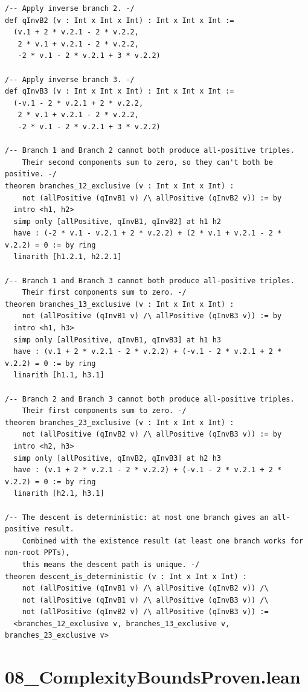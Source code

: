 \documentclass[11pt,twoside,openright]{book}
\theoremstyle{definition}
\theoremstyle{remark}
\begin{document}
\begin{lstlisting}[style=lean]
/-- Apply inverse branch 2. -/
def qInvB2 (v : Int x Int x Int) : Int x Int x Int :=
  (v.1 + 2 * v.2.1 - 2 * v.2.2,
   2 * v.1 + v.2.1 - 2 * v.2.2,
   -2 * v.1 - 2 * v.2.1 + 3 * v.2.2)

/-- Apply inverse branch 3. -/
def qInvB3 (v : Int x Int x Int) : Int x Int x Int :=
  (-v.1 - 2 * v.2.1 + 2 * v.2.2,
   2 * v.1 + v.2.1 - 2 * v.2.2,
   -2 * v.1 - 2 * v.2.1 + 3 * v.2.2)

/-- Branch 1 and Branch 2 cannot both produce all-positive triples.
    Their second components sum to zero, so they can't both be positive. -/
theorem branches_12_exclusive (v : Int x Int x Int) :
    not (allPositive (qInvB1 v) /\ allPositive (qInvB2 v)) := by
  intro <h1, h2>
  simp only [allPositive, qInvB1, qInvB2] at h1 h2
  have : (-2 * v.1 - v.2.1 + 2 * v.2.2) + (2 * v.1 + v.2.1 - 2 * v.2.2) = 0 := by ring
  linarith [h1.2.1, h2.2.1]

/-- Branch 1 and Branch 3 cannot both produce all-positive triples.
    Their first components sum to zero. -/
theorem branches_13_exclusive (v : Int x Int x Int) :
    not (allPositive (qInvB1 v) /\ allPositive (qInvB3 v)) := by
  intro <h1, h3>
  simp only [allPositive, qInvB1, qInvB3] at h1 h3
  have : (v.1 + 2 * v.2.1 - 2 * v.2.2) + (-v.1 - 2 * v.2.1 + 2 * v.2.2) = 0 := by ring
  linarith [h1.1, h3.1]

/-- Branch 2 and Branch 3 cannot both produce all-positive triples.
    Their first components sum to zero. -/
theorem branches_23_exclusive (v : Int x Int x Int) :
    not (allPositive (qInvB2 v) /\ allPositive (qInvB3 v)) := by
  intro <h2, h3>
  simp only [allPositive, qInvB2, qInvB3] at h2 h3
  have : (v.1 + 2 * v.2.1 - 2 * v.2.2) + (-v.1 - 2 * v.2.1 + 2 * v.2.2) = 0 := by ring
  linarith [h2.1, h3.1]

/-- The descent is deterministic: at most one branch gives an all-positive result.
    Combined with the existence result (at least one branch works for non-root PPTs),
    this means the descent path is unique. -/
theorem descent_is_deterministic (v : Int x Int x Int) :
    not (allPositive (qInvB1 v) /\ allPositive (qInvB2 v)) /\
    not (allPositive (qInvB1 v) /\ allPositive (qInvB3 v)) /\
    not (allPositive (qInvB2 v) /\ allPositive (qInvB3 v)) :=
  <branches_12_exclusive v, branches_13_exclusive v, branches_23_exclusive v>

\end{lstlisting}

\clearpage

\section*{08\_ComplexityBoundsProven.lean}
\end{document}

